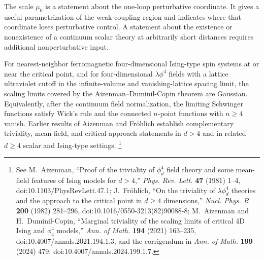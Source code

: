 \begin{remark}
The scale \(\mu_0\) is a statement about the one-loop perturbative coordinate.
It gives a useful parametrization of the weak-coupling region and indicates
where that coordinate loses perturbative control.  A statement about the
existence or nonexistence of a continuum scalar theory at arbitrarily short
distances requires additional nonperturbative input.
\end{remark}

\begin{quotedtheorem}
\label{qthm:standard-four-dimensional-scalar-triviality}
For nearest-neighbor ferromagnetic four-dimensional Ising-type spin systems at
or near the critical point, and for four-dimensional \(\lambda\phi^4\) fields
with a lattice ultraviolet cutoff in the infinite-volume and vanishing-lattice
spacing limit, the scaling limits covered by the
Aizenman--Duminil-Copin theorem are Gaussian.  Equivalently, after the
continuum field normalization, the limiting Schwinger functions satisfy
Wick's rule and the connected \(n\)-point functions with \(n\ge4\) vanish.
Earlier results of Aizenman and Fr\"ohlich establish complementary
triviality, mean-field, and critical-approach statements in \(d>4\) and in
related \(d\ge4\) scalar and Ising-type settings.
\footnote{See M.~Aizenman, ``Proof of the triviality of
\(\phi_d^4\) field theory and some mean-field features of Ising models for
\(d>4\),'' \emph{Phys. Rev. Lett.} \textbf{47} (1981) 1--4,
doi:10.1103/PhysRevLett.47.1; J.~Fr\"ohlich, ``On the triviality of
\(\lambda\phi_d^4\) theories and the approach to the critical point in
\(d\ge4\) dimensions,'' \emph{Nucl. Phys. B} \textbf{200} (1982) 281--296,
doi:10.1016/0550-3213(82)90088-8; M.~Aizenman and H.~Duminil-Copin,
``Marginal triviality of the scaling limits of critical 4D Ising and
\(\phi^4_4\) models,'' \emph{Ann. of Math.} \textbf{194} (2021) 163--235,
doi:10.4007/annals.2021.194.1.3, and the corrigendum in
\emph{Ann. of Math.} \textbf{199} (2024) 479,
doi:10.4007/annals.2024.199.1.7.}
\end{quotedtheorem}

